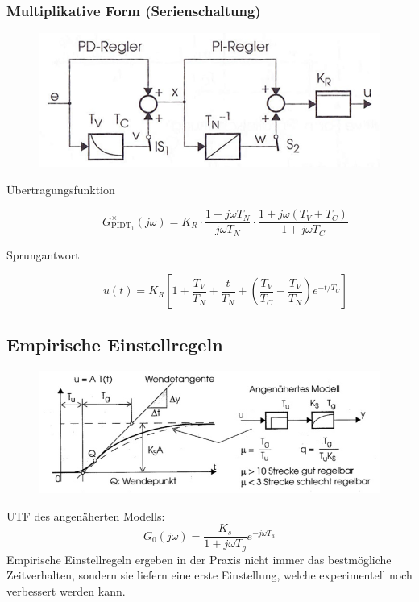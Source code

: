\subsubsection{Multiplikative Form (Serienschaltung)}
\begin{figure}[h!]
	\includegraphics[width = \linewidth]{./images/PID_Regler_mul}
\end{figure}
\begin{description}
	\item[\"Ubertragungsfunktion]
		\[
			G_{\text{PIDT}_1}^{\times} (j\omega) = 
			K_R \cdot \frac{1 + j\omega T_N}{j\omega T_N}
			\cdot \frac{1 + j\omega (T_V + T_C)}{1 + j\omega T_C}
		\]
	\item[Sprungantwort]
		\[
			u(t) = K_R \left[ 
			1 + \frac{T_V}{T_N} +\frac{t}{T_N} + \left(
			\frac{T_V}{T_C}-\frac{T_V}{T_N}
			\right) e^{-t/T_C}
			\right]
		\]
\end{description}

\subsection{Empirische Einstellregeln }
\begin{figure}[h!]
	\includegraphics[width=\linewidth]{./images/Empirisch_Regeln.jpg}
\end{figure}
UTF des angenäherten Modells:
\[
	G_0(j\omega) = \frac{K_s}{1+j\omega T_g} e^{-j\omega T_u}
\]
Empirische Einstellregeln ergeben in der Praxis nicht immer das bestmögliche Zeitverhalten, sondern sie liefern eine erste Einstellung, welche experimentell noch verbessert werden kann.
  
